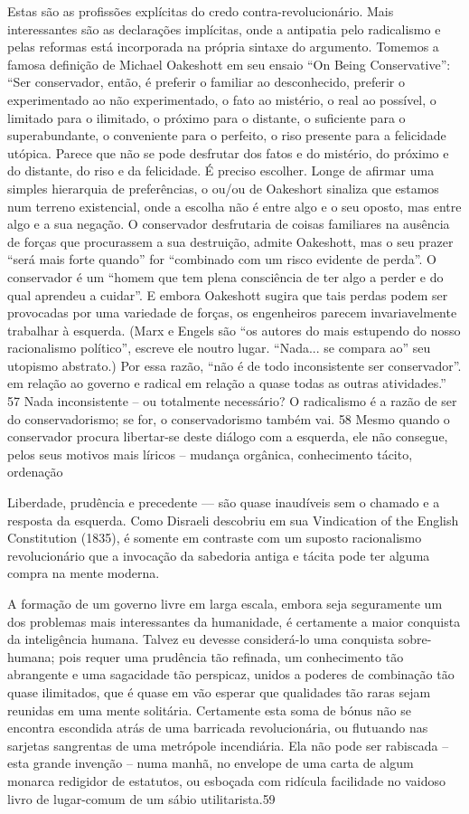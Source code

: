Estas são as profissões explícitas do credo contra-revolucionário. Mais interessantes são as declarações implícitas, onde a antipatia pelo radicalismo e pelas reformas está incorporada na própria sintaxe do argumento. Tomemos a famosa definição de Michael Oakeshott em seu ensaio “On Being Conservative”: “Ser conservador, então, é preferir o familiar ao desconhecido, preferir o experimentado ao não experimentado, o fato ao mistério, o real ao possível, o limitado para o ilimitado, o próximo para o distante, o suficiente para o superabundante, o conveniente para o perfeito, o riso presente para a felicidade utópica. Parece que não se pode desfrutar dos fatos e do mistério, do próximo e do distante, do riso e da felicidade. É preciso escolher. Longe de afirmar uma simples hierarquia de preferências, o ou/ou de Oakeshort sinaliza que estamos num terreno existencial, onde a escolha não é entre algo e o seu oposto, mas entre algo e a sua negação. O conservador desfrutaria de coisas familiares na ausência de forças que procurassem a sua destruição, admite Oakeshott, mas o seu prazer “será mais forte quando” for “combinado com um risco evidente de perda”. O conservador é um “homem que tem plena consciência de ter algo a perder e do qual aprendeu a cuidar”. E embora Oakeshott sugira que tais perdas podem ser provocadas por uma variedade de forças, os engenheiros parecem invariavelmente trabalhar à esquerda. (Marx e Engels são “os autores do mais estupendo do nosso racionalismo político”, escreve ele noutro lugar. “Nada... se compara ao” seu utopismo abstrato.) Por essa razão, “não é de todo inconsistente ser conservador”. em relação ao governo e radical em relação a quase todas as outras atividades.” {\color{blue}57} Nada inconsistente – ou totalmente necessário? O radicalismo é a razão de ser do conservadorismo; se for, o conservadorismo também vai. {\color{blue}58} Mesmo quando o conservador procura libertar-se deste diálogo com a esquerda, ele não consegue, pelos seus motivos mais líricos – mudança orgânica, conhecimento tácito, ordenação
 \par 
Liberdade, prudência e precedente — são quase inaudíveis sem o chamado e a resposta da esquerda. Como Disraeli descobriu em sua Vindication of the English Constitution (1835), é somente em contraste com um suposto racionalismo revolucionário que a invocação da sabedoria antiga e tácita pode ter alguma compra na mente moderna.
 \par 
A formação de um governo livre em larga escala, embora seja seguramente um dos problemas mais interessantes da humanidade, é certamente a maior conquista da inteligência humana. Talvez eu devesse considerá-lo uma conquista sobre-humana; pois requer uma prudência tão refinada, um conhecimento tão abrangente e uma sagacidade tão perspicaz, unidos a poderes de combinação tão quase ilimitados, que é quase em vão esperar que qualidades tão raras sejam reunidas em uma mente solitária. Certamente esta soma de bónus não se encontra escondida atrás de uma barricada revolucionária, ou flutuando nas sarjetas sangrentas de uma metrópole incendiária. Ela não pode ser rabiscada – esta grande invenção – numa manhã, no envelope de uma carta de algum monarca redigidor de estatutos, ou esboçada com ridícula facilidade no vaidoso livro de lugar-comum de um sábio utilitarista.{\color{blue}59}
